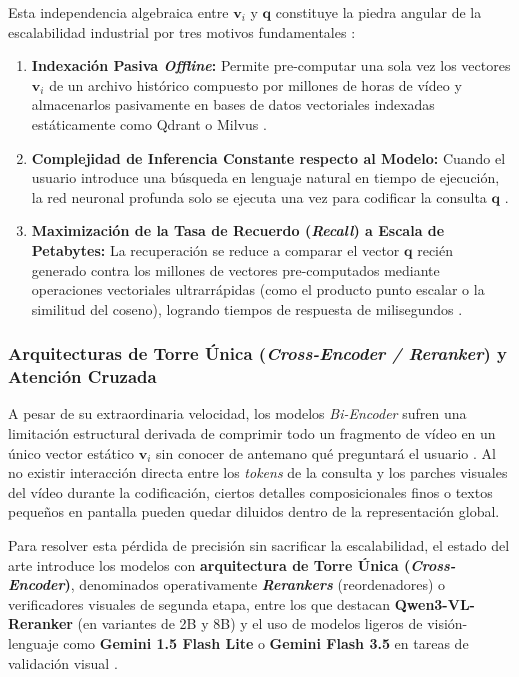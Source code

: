 Esta independencia algebraica entre $\mathbf{v}_i$ y $\mathbf{q}$ constituye la piedra angular de la escalabilidad industrial por tres motivos fundamentales \cite{learnopencv_qwen3}:
\begin{enumerate}
    \item \textbf{Indexación Pasiva \textit{Offline}:} Permite pre-computar una sola vez los vectores $\mathbf{v}_i$ de un archivo histórico compuesto por millones de horas de vídeo y almacenarlos pasivamente en bases de datos vectoriales indexadas estáticamente como Qdrant o Milvus \cite{learnopencv_qwen3}.
    \item \textbf{Complejidad de Inferencia Constante respecto al Modelo:} Cuando el usuario introduce una búsqueda en lenguaje natural en tiempo de ejecución, la red neuronal profunda solo se ejecuta una vez para codificar la consulta $\mathbf{q}$ \cite{learnopencv_qwen3}.
    \item \textbf{Maximización de la Tasa de Recuerdo (\textit{Recall}) a Escala de Petabytes:} La recuperación se reduce a comparar el vector $\mathbf{q}$ recién generado contra los millones de vectores pre-computados mediante operaciones vectoriales ultrarrápidas (como el producto punto escalar o la similitud del coseno), logrando tiempos de respuesta de milisegundos \cite{learnopencv_qwen3, qwen3_vl_emb2026}.
\end{enumerate}

\subsubsection{Arquitecturas de Torre Única (\textit{Cross-Encoder / Reranker}) y Atención Cruzada}
\label{subsubsec:arquitectura_cross_encoder}

A pesar de su extraordinaria velocidad, los modelos \textit{Bi-Encoder} sufren una limitación estructural derivada de comprimir todo un fragmento de vídeo en un único vector estático $\mathbf{v}_i$ sin conocer de antemano qué preguntará el usuario \cite{learnopencv_qwen3, qwen3_vl_emb2026}. Al no existir interacción directa entre los \textit{tokens} de la consulta y los parches visuales del vídeo durante la codificación, ciertos detalles composicionales finos o textos pequeños en pantalla pueden quedar diluidos dentro de la representación global.

Para resolver esta pérdida de precisión sin sacrificar la escalabilidad, el estado del arte introduce los modelos con \textbf{arquitectura de Torre Única (\textit{Cross-Encoder})}, denominados operativamente \textbf{\textit{Rerankers}} (reordenadores) o verificadores visuales de segunda etapa, entre los que destacan \textbf{Qwen3-VL-Reranker} (en variantes de 2B y 8B) y el uso de modelos ligeros de visión-lenguaje como \textbf{Gemini 1.5 Flash Lite} o \textbf{Gemini Flash 3.5} en tareas de validación visual \cite{learnopencv_qwen3, qwen3_vl_emb2026}.

